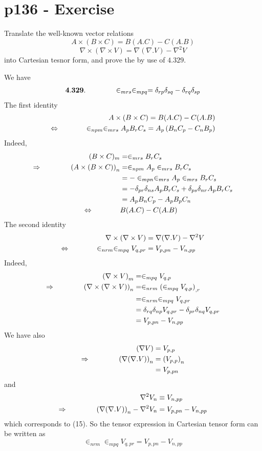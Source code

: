 \section{p136 - Exercise}
\begin{tcolorbox}
Translate the well-known vector relations
$$A\times (B\times C)= B(A.  C)-C(A.B)$$
$$\nabla \times (\nabla \times V)= \nabla (\nabla .  V )-\nabla^2V$$
into Cartesian tesnor form, and prove the by use of $4.329$.
\end{tcolorbox}
We have 
\begin{align}
\mathbf{4.329.}\quad\quad\quad\quad \in_{mrs}\in_{mpq} = \delta_{rp}\delta_{sq}-\delta_{rq}\delta_{sp}
\end{align}
The first identity
\begin{align}
A\times (B\times C)= B(A.  C)-C(A.B)\\
\Leftrightarrow\quad\quad\quad\quad \in_{npm}\in_{mrs}A_p B_r C_s = A_p\left(B_n C_p-C_n B_p\right)
\end{align}
Indeed,
\begin{align}
(B\times C)_m &= \in_{mrs}B_rC_s\\
\Rightarrow\quad\quad\quad\quad \left(A\times (B\times C)\right)_n &=\in_{npm}A_p \in_{mrs}B_rC_s\\
&=-\in_{mpn}\in_{mrs}A_p \in_{mrs}B_r C_s\\
&= -\delta_{pr}\delta_{ns}A_pB_rC_s+\delta_{ps}\delta_{nr}A_pB_rC_s\\
&= A_pB_nC_p-A_pB_pC_n\\
\Leftrightarrow\quad\quad\quad\quad & B(A.  C)-C(A.B)
\end{align}
The second identity
\begin{align}
\nabla \times (\nabla \times V)&= \nabla (\nabla .  V )-\nabla^2V\\
\Leftrightarrow \quad\quad\quad\quad \in_{nrm}\in_{mpq}V_{q,pr} &= V_{p,pn}- V_{n,pp}
\end{align}
Indeed,
\begin{align}
\left(\nabla \times V\right)_m &= \in_{mpq}V_{q,p}\\
\Rightarrow\quad\quad\quad\quad \left(\nabla  \times (\nabla \times V)\right)_n &=\in_{nrm}\left(\in_{mpq}V_{q,p}\right)_{,r}\\
 &=\in_{nrm}\in_{mpq}V_{q,pr}\\
 &=\delta_{rq}\delta_{np}V_{q,pr}-\delta_{pr}\delta_{nq}V_{q,pr}\\
 &= V_{p,pn}-V_{n,pp}
\end{align}
We have also
\begin{align}
\left(\nabla V\right) &= V_{p,p}\\
\Rightarrow\quad\quad\quad\quad \left(\nabla (\nabla .  V )\right)_n &= \left(V_{p,p}\right)_n\\
&= V_{p,pn}
\end{align}
and 
\begin{align}
\nabla^2 V_n  & \equiv  V_{n,pp} \\
\Rightarrow\quad\quad\quad\quad \left(\nabla (\nabla .  V )\right)_n- \nabla^2 V_n &= V_{p,pn}- V_{n,pp}
\end{align}
which corresponds to (15).
So the tensor expression in Cartesian tensor form can be written as 
$$\in_{nrm}\in_{mpq}V_{q,pr} = V_{p,pn}- V_{n,pp}$$

